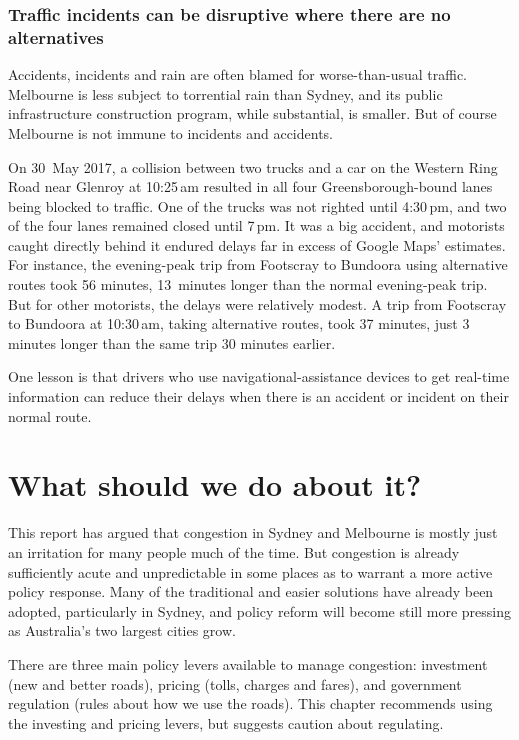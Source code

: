 \documentclass{grattan}
\begin{document}
\subsection{Traffic incidents can be disruptive where there are no alternatives}

Accidents, incidents and rain are often blamed for worse-than-usual traffic. Melbourne is less subject to torrential rain than Sydney, and its public infrastructure construction program, while substantial, is smaller.
But of course Melbourne is not immune to incidents and accidents.

On 30~May 2017, a collision between two trucks and a car on the Western Ring Road near Glenroy at 10:25\,am resulted in all four Greensborough-bound lanes being blocked to traffic.
One of the trucks was not righted until 4:30\,pm, and two of the four lanes remained closed until 7\,pm.
It was a big accident, and motorists caught directly behind it endured delays far in excess of Google Maps' estimates. For instance, the evening-peak trip from Footscray to Bundoora using alternative routes took 56 minutes, 13~minutes longer than the normal evening-peak trip.
But for other motorists, the delays were relatively modest.
A trip from Footscray to Bundoora  at 10:30\,am, taking alternative routes, took 37 minutes, just 3 minutes longer than the same trip 30 minutes earlier.

One lesson is that drivers who use navigational-assistance devices to get real-time information can reduce their delays when there is an accident or incident on their normal route.

\chapter{What should we do about it?}\label{chap:what-should-we-do-about-it}

This report has argued that congestion in Sydney and Melbourne is mostly just an irritation for many people much of the time.
But congestion is already sufficiently acute and unpredictable in some places as to warrant a more active policy response. Many of the traditional and easier solutions have already been adopted, particularly in Sydney, and policy reform will become still more pressing as Australia's two largest cities grow.

There are three main policy levers available to manage congestion: investment (new and better roads), pricing (tolls, charges and fares), and government regulation (rules about how we use the roads).
This chapter recommends using the investing and pricing levers, but suggests caution about regulating.
\end{document}
